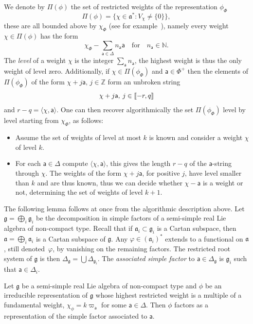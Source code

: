 \documentclass[AHL,Unicode,longabstracts,MathTools]{cedram}
\renewcommand{\sf}[1]{{\mathsf{#1}}}
\newcommand{\sroot}{{\sf{a}}}
\newcommand{\poids}{\sf{\Pi}}
\newcommand{\roots}{\mathsf{\Phi}}
\newcommand{\Z}{\mathbb{Z}}
\newcommand{\N}{\mathbb{N}}
\newcommand{\simple}{{\sf \Delta}}
\newcommand{\Fund}{\Phi}
\newcommand{\peso}{\varpi}
\renewcommand{\/}{\backslash}
\newcommand{\<}{\langle}
\renewcommand{\>}{\rangle}
\renewcommand{\ge}{\mathfrak{g}}
\renewcommand{\a}{\mathfrak{a}}
\newcommand{\llbracket}{\mathopen{[\mkern -2.7mu[}}
\newcommand{\rrbracket}{\mathclose{]\mkern -2.7mu]}}
\newcommand{\lb}{\llbracket}
\newcommand{\rb}{\rrbracket}
\begin{document}
We denote by $\poids(\phi)$ the set of restricted weights of the representation $\phi_\Fund$
\[
\poids(\phi)=\bigl\{\chi\in\a^*:V_\chi\neq\{0\}\bigr\},
\]
these are all bounded above by $\chi_\Fund$ (see for example~\cite[Section~13.4, Lemma~B]{james}),
namely every weight $\chi\in\poids(\phi)$ has the form
\[
\chi_\Fund-\sum_{\sroot\in\simple} n_\sroot\sroot\quad \text{for}\quad n_\sroot\in\N.
\]
The \emph{level} of a weight $\chi$ is the integer $\sum_\sroot n_\sroot$, the highest weight is thus the only weight of level zero.
Additionally, if $\chi\in\poids(\phi_\Fund)$ and $\sroot\in\roots^+$ then the elements of $\poids(\phi_\Fund)$ of the form $\chi+j\sroot,\, j\in\Z$ form an unbroken string
\[
\chi+j\sroot,\: j\in\lb-r,q\rb
\]
and $r-q=\<\chi,\sroot\>$. One can then recover algorithmically the set $\poids(\phi_\Fund)$ level by level starting from $\chi_\Fund$, as follows:
\begin{itemize}
\item Assume the set of weights of level at most $ k$ is known and consider a weight $\chi$ of level $k$.
\item For each $\sroot\in\simple$ compute $\<\chi,\sroot\>$, this gives the length $r-q$ of the $\sroot$-string through $\chi$. The weights of the form $\chi +j\sroot$, for positive $j$, have level smaller than $k$ and are thus known, thus we can decide whether $\chi-\sroot$ is a weight or not, determining the set of weights of level $k+1$.
\end{itemize}

The following lemma follows at once from the algorithmic description above. Let $\ge=\bigoplus_i\ge_i$ be the decomposition in simple factors of a semi-simple real Lie algebra of non-compact type. Recall that if $\a_i \subset\ge_i$ is a Cartan subspace, then $\a=\bigoplus_i\a_i$ is a Cartan subspace of $\ge$. Any $\varphi\in(\a_i)^*$ extends to a functional on $\a$, still denoted~$\varphi$, by vanishing on the remaining factors. The restricted root system of $\ge$ is then $\simple_\ge=\bigcup \simple_{\ge_i}$. The \emph{associated simple factor} to $\sroot\in\simple_\ge$ is $\ge_i$ such that $\sroot\in\simple_i$.



\begin{lemm}\label{simple}
Let $\ge$ be a semi-simple real Lie algebra of non-compact type and $\phi$ be an irreducible representation of $\ge$ whose highest restricted weight is a multiple of a fundamental weight, $\chi_\phi=k\peso_\sroot$ for some $\sroot\in\simple$. Then $\phi$ factors as a representation of the simple factor associated to $\sroot$.
\end{lemm}
\end{document}
